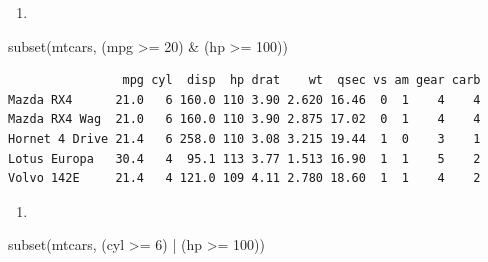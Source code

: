 \documentclass[
  letterpaper,
  DIV=11,
  numbers=noendperiod]{scrreprt}
\newenvironment{Shaded}{\begin{snugshade}}{\end{snugshade}}
\newcommand{\DecValTok}[1]{\textcolor[rgb]{0.68,0.00,0.00}{#1}}
\newcommand{\FunctionTok}[1]{\textcolor[rgb]{0.28,0.35,0.67}{#1}}
\newcommand{\NormalTok}[1]{\textcolor[rgb]{0.00,0.23,0.31}{#1}}
\newcommand{\SpecialCharTok}[1]{\textcolor[rgb]{0.37,0.37,0.37}{#1}}
\providecommand{\tightlist}{%
  \setlength{\itemsep}{0pt}\setlength{\parskip}{0pt}}\usepackage{longtable,booktabs,array}
\begin{document}
\begin{enumerate}
\def\labelenumi{\alph{enumi})}
\setcounter{enumi}{4}
\tightlist
\item
\end{enumerate}

\begin{Shaded}
\begin{Highlighting}[]
\FunctionTok{subset}\NormalTok{(mtcars, (mpg }\SpecialCharTok{\textgreater{}=} \DecValTok{20}\NormalTok{) }\SpecialCharTok{\&}\NormalTok{ (hp }\SpecialCharTok{\textgreater{}=} \DecValTok{100}\NormalTok{))}
\end{Highlighting}
\end{Shaded}

\begin{verbatim}
                mpg cyl  disp  hp drat    wt  qsec vs am gear carb
Mazda RX4      21.0   6 160.0 110 3.90 2.620 16.46  0  1    4    4
Mazda RX4 Wag  21.0   6 160.0 110 3.90 2.875 17.02  0  1    4    4
Hornet 4 Drive 21.4   6 258.0 110 3.08 3.215 19.44  1  0    3    1
Lotus Europa   30.4   4  95.1 113 3.77 1.513 16.90  1  1    5    2
Volvo 142E     21.4   4 121.0 109 4.11 2.780 18.60  1  1    4    2
\end{verbatim}

\begin{enumerate}
\def\labelenumi{\alph{enumi})}
\setcounter{enumi}{5}
\tightlist
\item
\end{enumerate}

\begin{Shaded}
\begin{Highlighting}[]
\FunctionTok{subset}\NormalTok{(mtcars, (cyl }\SpecialCharTok{\textgreater{}=} \DecValTok{6}\NormalTok{) }\SpecialCharTok{|}\NormalTok{ (hp }\SpecialCharTok{\textgreater{}=} \DecValTok{100}\NormalTok{))}
\end{Highlighting}
\end{Shaded}
\end{document}
